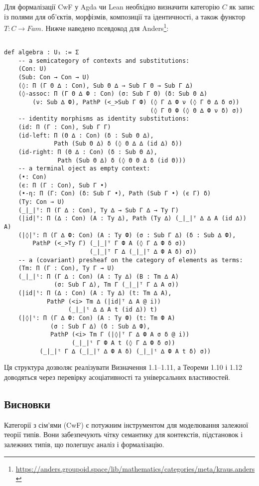 \documentclass{article}
\theoremstyle{definition}
\begin{document}
Для формалізації CwF у Agda чи Lean необхідно визначити категорію $C$ як запис із полями
для об’єктів, морфізмів, композиції та ідентичності, а також функтор $T:C \rightarrow Fam$.
Нижче наведено псевдокод для Anders\footnote{\url{https://anders.groupoid.space/lib/mathematics/categories/meta/kraus.anders}}:

\begin{lstlisting}

def algebra : U₁ := Σ
    -- a semicategory of contexts and substitutions:
    (Con: U)
    (Sub: Con → Con → U)
    (◊: Π (Г Θ ∆ : Con), Sub Θ ∆ → Sub Г Θ → Sub Г ∆)
    (◊-assoc: Π (Г Θ ∆ Ф : Con) (σ: Sub Г Θ) (δ: Sub Θ ∆)
        (ν: Sub ∆ Ф), PathP (<_>Sub Г Ф) (◊ Г ∆ Ф ν (◊ Г Θ ∆ δ σ))
                                         (◊ Г Θ Ф (◊ Θ ∆ Ф ν δ) σ))
    -- identity morphisms as identity substitutions:
    (id: Π (Г : Con), Sub Г Г)
    (id-left: Π (Θ ∆ : Con) (δ : Sub Θ ∆),
              Path (Sub Θ ∆) δ (◊ Θ ∆ ∆ (id ∆) δ))
    (id-right: Π (Θ ∆ : Con) (δ : Sub Θ ∆),
               Path (Sub Θ ∆) δ (◊ Θ Θ ∆ δ (id Θ)))
    -- a terminal oject as empty context:
    (•: Con)
    (є: Π (Г : Con), Sub Г •)
    (•-η: Π (Г: Con) (δ: Sub Г •), Path (Sub Г •) (є Г) δ)
    (Ty: Con → U)
    (_|_|ᵀ: Π (Г ∆ : Con), Ty ∆ → Sub Г ∆ → Ty Г)
    (|id|ᵀ: Π (∆ : Con) (A : Ty ∆), Path (Ty ∆) (_|_|ᵀ ∆ ∆ A (id ∆)) A)
    (|◊|ᵀ: Π (Г ∆ Ф: Con) (A : Ty Ф) (σ : Sub Г ∆) (δ : Sub ∆ Ф),
        PathP (<_>Ty Г) (_|_|ᵀ Г Ф A (◊ Г ∆ Ф δ σ))
                        (_|_|ᵀ Г ∆ (_|_|ᵀ ∆ Ф A δ) σ))
    -- a (covariant) presheaf on the category of elements as terms:
    (Tm: Π (Г : Con), Ty Г → U)
    (_|_|ᵗ: Π (Г ∆ : Con) (A : Ty ∆) (B : Tm ∆ A)
              (σ: Sub Г ∆), Tm Г (_|_|ᵀ Г ∆ A σ))
    (|id|ᵗ: Π (∆ : Con) (A : Ty ∆) (t: Tm ∆ A),
            PathP (<i> Tm ∆ (|id|ᵀ ∆ A @ i))
                  (_|_|ᵗ ∆ ∆ A t (id ∆)) t)
    (|◊|ᵗ: Π (Г ∆ Ф: Con) (A : Ty Ф) (t: Tm Ф A)
             (σ : Sub Г ∆) (δ : Sub ∆ Ф),
             PathP (<i> Tm Г (|◊|ᵀ Г ∆ Ф A σ δ @ i))
                   (_|_|ᵗ Г Ф A t (◊ Г ∆ Ф δ σ))
          (_|_|ᵗ Г ∆ (_|_|ᵀ ∆ Ф A δ) (_|_|ᵗ ∆ Ф A t δ) σ))
\end{lstlisting}

Ця структура дозволяє реалізувати Визначення 1.1–1.11, а Теореми 1.10 і 1.12 доводяться
через перевірку асоціативності та універсальних властивостей.

\newpage
\subsection{Висновки}

Категорії з сім’ями (CwF) є потужним інструментом для моделювання залежної теорії типів.
Вони забезпечують чітку семантику для контекстів, підстановок і залежних типів,
що полегшує аналіз і формалізацію.



\end{document}
